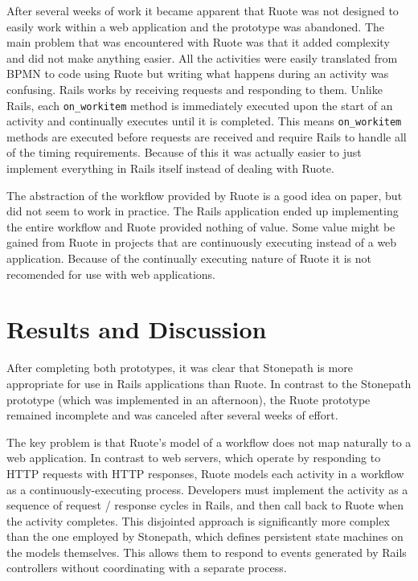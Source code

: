 \documentclass[document.tex]{subfiles}
\begin{document}
After several weeks of work it became apparent that Ruote was not designed to easily work within a web application and the prototype was abandoned. The main problem that was encountered with Ruote was that it added complexity and did not make anything easier. All the activities were easily translated from BPMN to code using Ruote but writing what happens during an activity was confusing. Rails works by receiving requests and responding to them. Unlike Rails, each \verb!on_workitem! method is immediately executed upon the start of an activity and continually executes until it is completed. This means \verb!on_workitem! methods are executed before requests are received and require Rails to handle all of the timing requirements. Because of this it was actually easier to just implement everything in Rails itself instead of dealing with Ruote.

The abstraction of the workflow provided by Ruote is a good idea on paper, but did not seem to work in practice. The Rails application ended up implementing the entire workflow and Ruote provided nothing of value. Some value might be gained from Ruote in projects that are continuously executing instead of a web application. Because of the continually executing nature of Ruote it is not recomended for use with web applications.

\FloatBarrier

\section {Results and Discussion}

After completing both prototypes, it was clear that Stonepath is more appropriate for use in Rails applications than Ruote. In contrast to the Stonepath prototype (which was implemented in an afternoon), the Ruote prototype remained incomplete and was canceled after several weeks of effort.

The key problem is that Ruote's model of a workflow does not map naturally to a web application. In contrast to web servers, which operate by responding to HTTP requests with HTTP responses, Ruote models each activity in a workflow as a continuously-executing process. Developers must implement the activity as a sequence of request / response cycles in Rails, and then call back to Ruote when the activity completes. This disjointed approach is significantly more complex than the one employed by Stonepath, which defines persistent state machines on the models themselves. This allows them to respond to events generated by Rails controllers without coordinating with a separate process.
\end{document}
